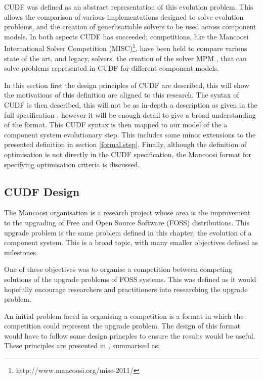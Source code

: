 CUDF was defined as an abstract representation of this evolution problem.
This allows the comparison of various implementations designed to solve evolution problems, and the creation of generlisatiable solvers to be used across component models.
In both aspects CUDF has succeeded;
competitions, like the Mancoosi International Solver Competition (MISC)\footnote{http://www.mancoosi.org/misc-2011/}, have been held to compare various state of the art, and legacy, solvers.
the creation of the solver MPM \cite{abate2011}, that can solve problems represented in CUDF for different component models.

In this section first the design principles of CUDF are described, this will show the motivations of this definition are aligned to this research.
The syntax of CUDF is then described, this will not be as in-depth a description as given in the full specification \cite{treinen2009common},
however it will be enough detail to give a broad understanding of the format.
This CUDF syntax is then mapped to our model of the a component system evolutionary step.
This includes some minor extensions to the presented definition in section \ref{formal.step}.
Finally, although the definition of optimisation is not directly in the CUDF specification, the Mancoosi format for specifying optimisation criteria is discussed.

\subsection{CUDF Design}
The Mancoosi organisation is a research project whose area is the improvement to the upgrading of Free and Open Source Software (FOSS) distributions.
This upgrade problem is the same problem defined in this chapter, the evolution of a component system.
This is a broad topic, with many smaller objectives defined as milestones.

One of these objectives was to organise a competition between competing solutions of the upgrade problems of FOSS systems.
This was defined as it would hopefully encourage researchers and practitioners into researching the upgrade problem.

An initial problem faced in organising a competition is a format in which the competition could represent the upgrade problem.
The design of this format would have to follow some design princples to ensure the results would be useful.
These principles are presented in \cite{treinen2009common}, summarised as:

